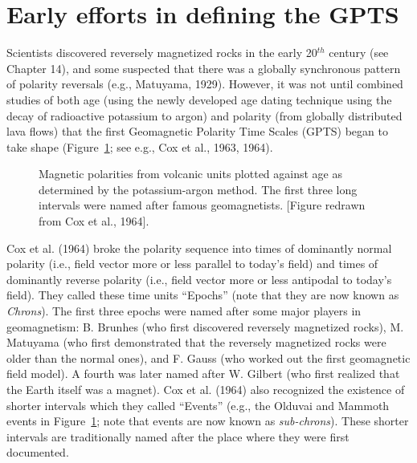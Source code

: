 \section{Early efforts in defining the GPTS}
\label{sect:gpts}

Scientists discovered reversely magnetized rocks in the early 20$^{th}$ century (see Chapter 14), and some suspected that there was a globally synchronous pattern of polarity reversals (e.g., 
Matuyama, 1929). \nocite{matuyama29}  However, it was not until combined  studies of both age (using the newly developed age dating technique using the decay of radioactive potassium to argon) and polarity (from globally distributed lava flows) that the first Geomagnetic Polarity Time Scales (GPTS) began to take shape (Figure~\ref{fig:cox64}; see e.g., 
Cox et al., 1963, 1964). \nocite{cox63}   \nocite{cox64}   

\begin{figure}[htb]
\epsfxsize 14cm
\centering {}
\caption{ Magnetic polarities from volcanic units plotted against age as determined by the potassium-argon method.   The first three  long intervals were named after famous geomagnetists.   [Figure redrawn from Cox et al., 1964].}
\label{fig:cox64}
\end{figure} \nocite{cox64}


Cox et al. (1964) broke the  polarity sequence   into times of
dominantly normal polarity (i.e., field vector more or less parallel to today's field) and times of dominantly reverse polarity (i.e., field vector more or less antipodal to today's field).
They  called these  time units ``Epochs''  (note that  they are now known as 
{\it Chrons}).  
The first three epochs were named after some major players in geomagnetism:  B. Brunhes (who first discovered reversely magnetized rocks), 
M. Matuyama (who first demonstrated that  the reversely magnetized rocks were older than the normal ones),  and F. Gauss (who worked out the first geomagnetic field model).  A fourth was later named after  W. Gilbert (who first realized that the Earth itself was a magnet).   
 Cox et al. (1964) also recognized the existence of shorter intervals which they called ``Events'' (e.g., the Olduvai and Mammoth events in Figure~\ref{fig:cox64}; note that events are now known as
 {\it sub-chrons}).   These shorter intervals are traditionally named after the place where they were first documented.  

